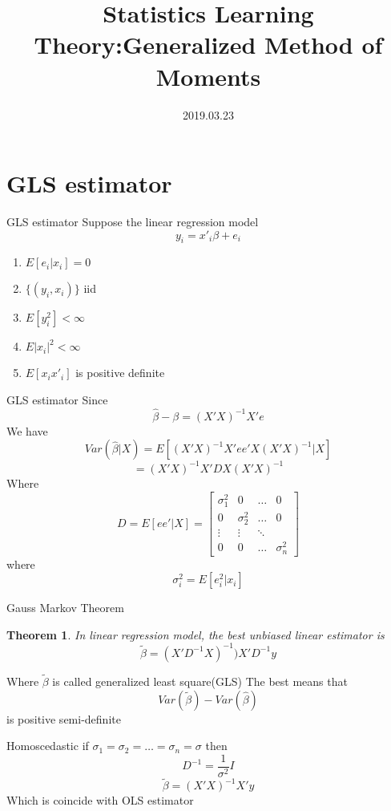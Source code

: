 \documentclass{beamer}
\title[Introduction]{Statistics Learning Theory:Generalized Method of Moments}
\author{}
\institute{}
\date{2019.03.23}
\newtheorem{thm}{Theorem}[subsection]
\begin{document}
\begin{frame}
  \titlepage
\end{frame}

\section{GLS estimator}
\begin{frame}{GLS estimator}
	Suppose the linear regression model
	\[y_i = x'_i \beta + e_i \]
	\begin{enumerate}
	\item $E[e_i|x_i]=0$
	\item $\{(y_i,x_i)\}$ iid
	\item $E[y^2_i]	< \infty$
	\item $E|x_i|^2 < \infty$
	\item $E[x_i x'_i] $ is positive definite
	\end{enumerate}
\end{frame}
\begin{frame}{GLS estimator}
Since 
\[\hat{\beta} - \beta = (X'X)^{-1}X'e\]
We have
\[Var(\hat{\beta}|X) = E[(X'X)^{-1}X'ee'X(X'X)^{-1}|X]\]
\[= (X'X)^{-1} X'DX(X'X)^{-1}\]
Where
\[D = E[ee'|X] = \begin{bmatrix}
				\sigma^2_{1} & 0 & \dots & 0 \\
				0 & \sigma^2_{2} & \dots & 0 \\
				\vdots & \vdots & \ddots  \\ 
				0 & 0 & \dots & \sigma^2_n
\end{bmatrix}\]
where
\[\sigma^2_i =  E[e^2_i|x_i]\]
\end{frame}
\begin{frame}{Gauss Markov Theorem}
	\begin{thm}
		In linear regression model, the best unbiased linear estimator is
	\[\tilde{\beta} = (X'D^{-1}X)^{-1} )X'D^{-1}y\]
	\end{thm}
	Where $\tilde{\beta}$ is called generalized least square(GLS)
	The best means that 
	\[Var(\tilde{\beta}) - Var(\hat{\beta})\]
	is positive semi-definite
\end{frame}
\begin{frame}{Homoscedastic}
	if $\sigma_1 = \sigma_2 =  \dots = \sigma_n  = \sigma$
	then 
	\[D^{-1} = \frac{1}{\sigma^2} I \]
	\[\tilde{\beta} = (X'X)^{-1} X' y\]
	Which is coincide with OLS estimator
\end{frame}
\end{document}
